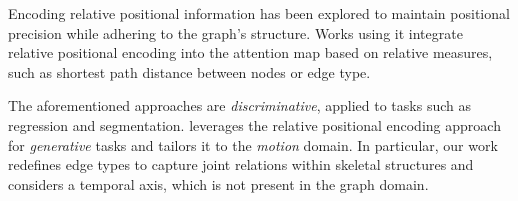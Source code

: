 Encoding relative positional information has been explored to maintain positional precision while adhering to the graph's structure. Works using it \cite{ying2021transformers, shaw2018self, park2022grpe} integrate relative positional encoding into the attention map based on relative measures, such as shortest path distance between nodes or edge type.

The aforementioned approaches are \emph{discriminative}, applied to tasks such as regression and segmentation.
\algoname leverages the relative positional encoding approach for \emph{generative} tasks and tailors it to the \emph{motion}
domain. In particular, our work redefines edge types to capture joint relations within skeletal structures and considers a temporal axis, which is not present in the graph domain.